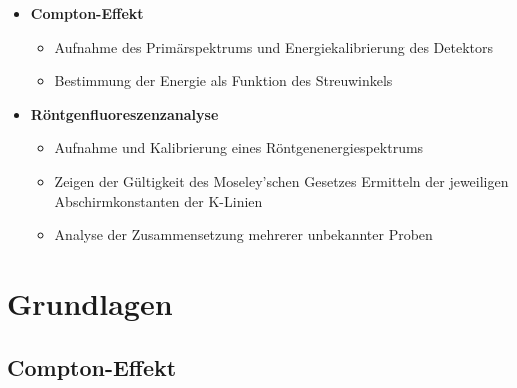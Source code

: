 \documentclass[ngerman]{scrartcl}
\begin{document}
\begin{itemize}
    \item \textbf{Compton-Effekt}
          \begin{itemize}
              \item Aufnahme des Primärspektrums und Energiekalibrierung des Detektors
              \item Bestimmung der Energie als Funktion des Streuwinkels
          \end{itemize}
    \item \textbf{Röntgenfluoreszenzanalyse}
          \begin{itemize}
              \item Aufnahme und Kalibrierung eines Röntgenenergiespektrums
              \item Zeigen der Gültigkeit des Moseley'schen Gesetzes Ermitteln der jeweiligen Abschirmkonstanten der K-Linien
              \item Analyse der Zusammensetzung mehrerer unbekannter Proben
          \end{itemize}
\end{itemize}


\section{Grundlagen}
\label{sec:grundlagen}

\subsection[Compton-Effekt]{Compton-Effekt \cite{ref:angabe_compton}}
\label{sub:grundlagen_compton}
\end{document}
